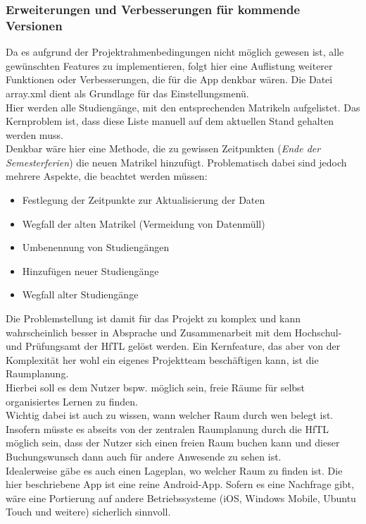 \begin{description}
\subsubsection{Erweiterungen und Verbesserungen für kommende Versionen}
Da es aufgrund der Projektrahmenbedingungen nicht möglich gewesen ist, alle gewünschten Features zu implementieren, folgt hier eine Auflistung weiterer Funktionen oder Verbesserungen, die für die App denkbar wären.
\label{pflege}
Die Datei array.xml dient als Grundlage für das Einstellungsmenü.\\
Hier werden alle Studiengänge, mit den entsprechenden Matrikeln aufgelistet. Das Kernproblem ist, dass diese Liste manuell auf dem aktuellen Stand gehalten werden muss.\\
Denkbar wäre hier eine Methode, die zu gewissen Zeitpunkten (\textit{Ende der Semesterferien}) die neuen Matrikel hinzufügt. Problematisch dabei sind jedoch mehrere Aspekte, die beachtet werden müssen:
\begin{itemize}
\item Festlegung der Zeitpunkte zur Aktualisierung der Daten
\item Wegfall der alten Matrikel (Vermeidung von Datenmüll)
\item Umbenennung von Studiengängen
\item Hinzufügen neuer Studiengänge
\item Wegfall alter Studiengänge
\end{itemize}
Die Problemstellung ist damit für das Projekt zu komplex und kann wahrscheinlich besser in Absprache und Zusammenarbeit mit dem Hochschul- und Prüfungsamt der HfTL  gelöst werden.
Ein Kernfeature, das aber von der Komplexität her wohl ein eigenes Projektteam beschäftigen kann, ist die Raumplanung.\\
Hierbei soll es dem Nutzer bspw. möglich sein, freie Räume für selbst organisiertes Lernen zu finden.\\ Wichtig dabei ist auch zu wissen, wann welcher Raum durch wen belegt ist. Insofern müsste es abseits von der zentralen Raumplanung durch die HfTL möglich sein, dass der Nutzer sich einen freien Raum buchen kann und dieser Buchungswunsch dann auch für andere Anwesende zu sehen ist.\\
Idealerweise gäbe es auch einen Lageplan, wo welcher Raum zu finden ist.
Die hier beschriebene App ist eine reine Android-App. Sofern es eine Nachfrage gibt, wäre eine Portierung auf andere Betriebssysteme (iOS, Windows Mobile, Ubuntu Touch und weitere) sicherlich sinnvoll.

\end{description} 
